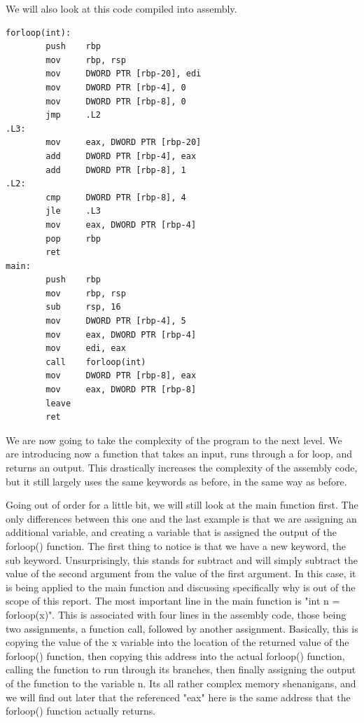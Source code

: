 \documentclass{article}
\theoremstyle{theorem}
\theoremstyle{definition}
\theoremstyle{remark}
\begin{document}
We will also look at this code compiled into assembly.

\begin{lstlisting}
forloop(int):
        push    rbp
        mov     rbp, rsp
        mov     DWORD PTR [rbp-20], edi
        mov     DWORD PTR [rbp-4], 0
        mov     DWORD PTR [rbp-8], 0
        jmp     .L2
.L3:
        mov     eax, DWORD PTR [rbp-20]
        add     DWORD PTR [rbp-4], eax
        add     DWORD PTR [rbp-8], 1
.L2:
        cmp     DWORD PTR [rbp-8], 4
        jle     .L3
        mov     eax, DWORD PTR [rbp-4]
        pop     rbp
        ret
main:
        push    rbp
        mov     rbp, rsp
        sub     rsp, 16
        mov     DWORD PTR [rbp-4], 5
        mov     eax, DWORD PTR [rbp-4]
        mov     edi, eax
        call    forloop(int)
        mov     DWORD PTR [rbp-8], eax
        mov     eax, DWORD PTR [rbp-8]
        leave
        ret
\end{lstlisting}

We are now going to take the complexity of the program to the next level. We are introducing now a function that takes an input, runs through a for loop, and returns an output. This drastically increases the complexity of the assembly code, but it still largely uses the same keywords as before, in the same way as before.

Going out of order for a little bit, we will still look at the main function first. The only differences between this one and the last example is that we are assigning an additional variable, and creating a variable that is assigned the output of the forloop() function. The first thing to notice is that we have a new keyword, the sub keyword. Unsurprisingly, this stands for subtract and will simply subtract the value of the second argument from the value of the first argument. In this case, it is being applied to the main function and discussing specifically why is out of the scope of this report. The most important line in the main function is "int n = forloop(x)". This is associated with four lines in the assembly code, those being two assignments, a function call, followed by another assignment. Basically, this is copying the value of the x variable into the location of the returned value of the forloop() function, then copying this address into the actual forloop() function, calling the function to run through its branches, then finally assigning the output of the function to the variable n. Its all rather complex memory shenanigans, and we will find out later that the referenced "eax" here is the same address that the forloop() function actually returns.
\end{document}
